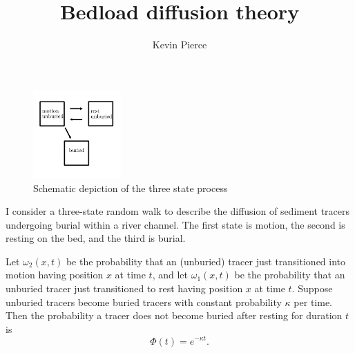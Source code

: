 \documentclass[11pt]{article}
\newcommand\be{\begin{equation}} %
\newcommand\ee{\end{equation}}   %
\begin{document}
\title{Bedload diffusion theory}
\author{Kevin Pierce}
\maketitle
\begin{figure}
	\centering
	\includegraphics[width=0.3\textwidth,keepaspectratio]{diagram.png}
	\caption{Schematic depiction of the three state process}
	\label{fig:schematic}
\end{figure}
I consider a three-state random walk to describe the diffusion of sediment tracers undergoing burial within a river channel.
The first state is motion, the second is resting on the bed, and the third is burial.



Let $\omega_2(x,t)$ be the probability that an (unburied) tracer just transitioned into motion having position $x$ at time $t$, and let $\omega_1(x,t)$ be the probability that an unburied tracer just transitioned to rest having position $x$ at time $t$.
Suppose unburied tracers become buried tracers with constant probability $\kappa$ per time.
Then the probability a tracer does not become buried after resting for duration $t$ is \be\Phi(t) = e^{-\kappa t}.\ee
\vspace{2cm}
\end{document}
